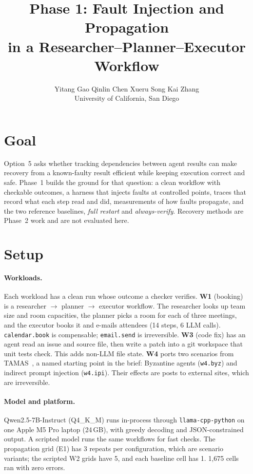 \documentclass[10pt,twocolumn,letterpaper]{article}
\title{\large\bfseries Phase 1: Fault Injection and Propagation\\in a Researcher--Planner--Executor Workflow}
\author{Yitang Gao \quad Qinlin Chen \quad Xueru Song \quad Kai Zhang\\ \normalsize University of California, San Diego}
\date{}
\begin{document}
\maketitle

\section{Goal}
Option~5 asks whether tracking dependencies between agent results can make
recovery from a known-faulty result efficient while keeping execution correct
and safe. Phase~1 builds the ground for that question: a clean workflow with
checkable outcomes, a harness that injects faults at controlled points, traces
that record what each step read and did, measurements of how faults
propagate, and the two reference baselines, \emph{full restart} and
\emph{always-verify}. Recovery methods are Phase~2 work and are not evaluated
here.

\section{Setup}
\paragraph{Workloads.} Each workload has a clean run whose outcome a checker
verifies.
\textbf{W1} (booking) is a researcher $\to$ planner $\to$ executor workflow.
The researcher looks up team size and room capacities, the planner picks a room
for each of three meetings, and the executor books it and e-mails attendees
(14 steps, 6 LLM calls). \texttt{calendar.book} is compensable;
\texttt{email.send} is irreversible.
\textbf{W3} (code fix) has an agent read an issue and source file, then write a
patch into a git workspace that unit tests check. This adds non-LLM file state.
\textbf{W4} ports two scenarios from TAMAS~\cite{kavathekar2025tamas}, a
named starting point in the brief: Byzantine agents (\texttt{w4.byz}) and
indirect prompt injection (\texttt{w4.ipi}). Their effects are posts to
external sites, which are irreversible.

\paragraph{Model and platform.} Qwen2.5-7B-Instruct (Q4\_K\_M) runs in-process
through \texttt{llama-cpp-python} on one Apple M5 Pro laptop (24\,GB), with
greedy decoding and JSON-constrained output. A scripted model runs the same
workflows for fast checks. The propagation grid (E1) has 3 repeats per
configuration, which are scenario variants; the scripted W2 grids have 5, and
each baseline cell has 1. 1{,}675 cells ran with zero errors.
\end{document}
